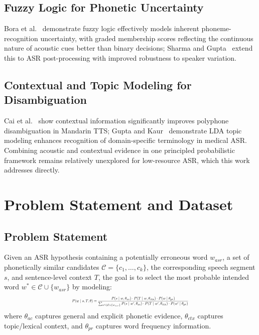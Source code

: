 \documentclass[10pt,conference]{IEEEtran}
\begin{document}
\subsection{Fuzzy Logic for Phonetic Uncertainty}
Bora et al.~\cite{bora2019fuzzy} demonstrate fuzzy logic effectively
models inherent phoneme-recognition uncertainty, with graded membership
scores reflecting the continuous nature of acoustic cues better than
binary decisions; Sharma and Gupta~\cite{sharma2020fuzzy} extend this to
ASR post-processing with improved robustness to speaker variation.

\subsection{Contextual and Topic Modeling for Disambiguation}
Cai et al.~\cite{cai2019polyphone} show contextual information
significantly improves polyphone disambiguation in Mandarin TTS; Gupta
and Kaur~\cite{gupta2021lda} demonstrate LDA topic modeling enhances
recognition of domain-specific terminology in medical ASR. Combining
acoustic and contextual evidence in one principled probabilistic
framework remains relatively unexplored for low-resource ASR, which this
work addresses directly.

\section{Problem Statement and Dataset}

\subsection{Problem Statement}
Given an ASR hypothesis containing a potentially erroneous word
$w_{asr}$, a set of phonetically similar candidates
$\mathcal{C} = \{c_1, \ldots, c_k\}$, the corresponding speech segment
$s$, and sentence-level context $T$, the goal is to select the most
probable intended word $w^* \in \mathcal{C} \cup \{w_{asr}\}$ by
modeling:
\begin{equation}
\resizebox{0.48\textwidth}{!}{$\displaystyle
P(w \mid s, T, \theta) = \frac{P(s \mid w, \theta_{ac}) \cdot P(T \mid w, \theta_{ctx}) \cdot P(w \mid \theta_{pr})}
{\sum_{w' \in \mathcal{C} \cup \{w_{asr}\}} P(s \mid w', \theta_{ac}) \cdot P(T \mid w', \theta_{ctx}) \cdot P(w' \mid \theta_{pr})}
$}
\end{equation}
where $\theta_{ac}$ captures general and explicit phonetic evidence,
$\theta_{ctx}$ captures topic/lexical context, and $\theta_{pr}$ captures
word frequency information.
\end{document}
